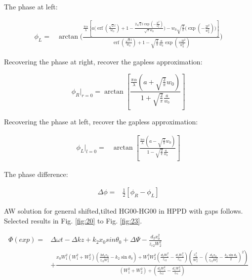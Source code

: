 \documentclass[aps,twoside,secnumarabic,balancelastpage,amsmath,amssymb,nofootinbib,hyperref=pdftex]{revtex4}
\begin{document}
The phase at left:

\begin{align*}
	\phi_L  =&
			\arctan
				\big(
				\frac{
							\frac{\pi \alpha}{\lambda}
				\left[
				  a 
					\Bigg(\operatorname{erf}(\frac{\sqrt{2} l}{w_0})
			             +
			             1
			             -
			                        	\frac
			                        	{2 \sqrt{2} l \exp({-\frac{2l^2}{w_0^2}})}
			                        	{ \sqrt{\pi} w_0} 
			             \Bigg)        
			        -  
        w_{0}\sqrt{\frac{2}{\pi}}
        \Bigg(        	                        	
                        \exp({-\frac{2l^2}{w_0^2}}) 
			        \Bigg) 
				\right] }
				{
				             \operatorname{erf}(\frac{\sqrt{2} l}{w_0})
             +
             1
         -
         \sqrt{ \frac{2}{\pi} }
         \frac{a}{w_{0}}
         \exp( \frac{-2l^2}{w_0^2}) }
	\big)
\end{align*}


Recovering the phase at right, recover the gapless approximation:

\begin{equation*}
	\phi_R |_{r=0} =
			\arctan
				\left[
				\frac{
							\frac{\pi \alpha}{\lambda}
				(
					a      
			        +  
			        \sqrt{\frac{2}{\pi}} w_0
				) }
				{
             1
         +
         \sqrt{ \frac{2}{\pi} }
         \frac{a}{w_{0}} }
	\right]
\end{equation*}

Recovering the phase at left, recover the gapless approximation:

\begin{align*}
	\phi_L|_{l=0}  =&
			\arctan
				\left[
				\frac{
							\frac{\pi \alpha}{\lambda}
				(
				 	 a      
			        -  
			       \sqrt{\frac{2}{\pi}} w_0
				) }
				{
             1
         -
         \sqrt{ \frac{2}{\pi} }
         \frac{a}{w_{0}} }
	\right]
\end{align*}

The phase difference:

\begin{align*}
	\Delta \phi = &
		 \frac{1}{2} 
		 \left[
		 	\phi_R - \phi_L
		 \right]							 	
\end{align*}

\clearpage
AW solution for general shifted,tilted HG00-HG00 in HPPD with gaps follows. Selected results in Fig. \ref{fig:20} to Fig. \ref{fig:23}.

\begin{align*}
		\Phi(exp) =&
            \Delta \omega t - \Delta kz + k_2 x_0 sin \theta_0 + \Delta\Psi - \frac{d_2 x_0^2}{z_{r2}W_2^2}
            \\&+
            \frac
            {
                x_0 W_1^2 (W_1^2 + W_2^2)
                ( \frac{2d_2 x_0}{z_{r2} W_2^2}-k_2 \sin \theta_0)
                +
                W_1^2 W_2^2 (\frac{d_2W_1^2}{z_{r2}}-\frac{d_1 W_2^2}{z_{r1}})
                (\frac{x_0^2}{W_2^4}-(\frac{d_2 x_0}{z_{r2} W_2^2}-\frac{k_2 \sin\theta_0}{2})^2 )
            }
            {
                (W_1^2+W_2^2) 
                +
                (\frac{d_2 W_1^2}{z_{r2} }- \frac{d_1 W_2^2}{z_{r1}})
            }
\end{align*}
\end{document}
